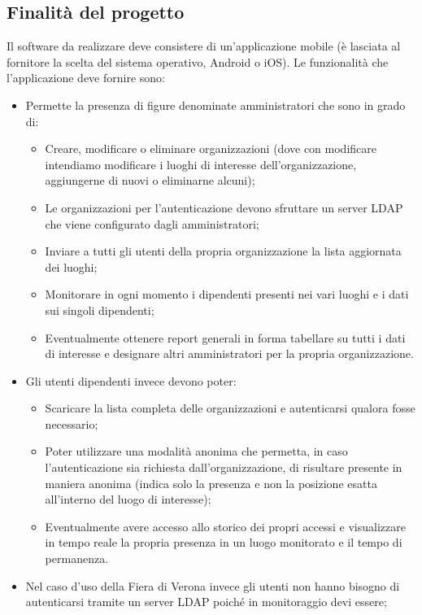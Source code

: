 \documentclass[../studio-di-fattibilita.tex]{subfiles}
\begin{document}
	\subsection{Finalità del progetto}
	\label{sec:finalità_del_progetto}
	Il software da realizzare deve consistere di un'applicazione mobile (è lasciata al fornitore la scelta del sistema operativo, Android o iOS). Le funzionalità che l'applicazione deve fornire sono:
	\begin{itemize}
		\item Permette la presenza di figure denominate amministratori che sono in grado di:
		\begin{itemize}
		    \item Creare, modificare o eliminare organizzazioni (dove con modificare intendiamo modificare i luoghi di interesse dell’organizzazione, aggiungerne di nuovi o eliminarne alcuni);
		    \item Le organizzazioni per l’autenticazione devono sfruttare un server LDAP che viene configurato dagli amministratori;
		    \item Inviare a tutti gli utenti della propria organizzazione la lista aggiornata dei luoghi;
		    \item Monitorare in ogni momento i dipendenti presenti nei vari luoghi e i dati sui singoli dipendenti;
		    \item Eventualmente ottenere report generali in forma tabellare su tutti i dati di interesse e designare altri amministratori per la propria organizzazione.
		\end{itemize}
		\item Gli utenti dipendenti invece devono poter:
		\begin{itemize}
		    \item Scaricare la lista completa delle organizzazioni e autenticarsi qualora fosse necessario;
		    \item Poter utilizzare una modalità anonima che permetta, in caso l’autenticazione sia richiesta dall’organizzazione, di risultare presente in maniera anonima (indica solo la presenza e non la posizione esatta all’interno del luogo di interesse);
		    \item Eventualmente avere accesso allo storico dei propri accessi e visualizzare in tempo reale la propria presenza in un luogo monitorato e il tempo di permanenza.
		\end{itemize}
		\item Nel caso d’uso della Fiera di Verona invece gli utenti non hanno bisogno di autenticarsi tramite un server LDAP poiché in monitoraggio devi essere;

\end{itemize}
\end{document}
